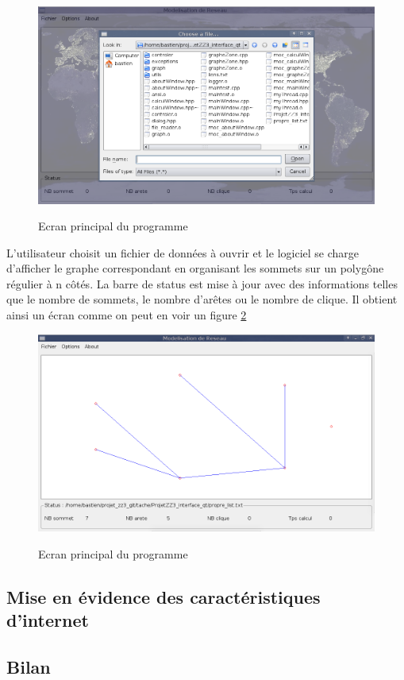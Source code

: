 \begin{figure}[H]
\centering
 \fbox
 {
 \includegraphics[width=16cm]{./schema/capture_ecran_donnees.png}
 }
  \caption{\label{ecran_donnees}Ecran principal du programme}
\end{figure}

L'utilisateur choisit un fichier de donn\'ees \`a ouvrir et le logiciel se charge d'afficher le graphe correspondant en organisant les sommets sur un polyg\^one r\'egulier \`a n c\^ot\'es.
La barre de status est mise \`a jour avec des informations telles que le nombre de sommets, le nombre d'ar\^etes ou le nombre de clique. Il obtient ainsi un \'ecran comme on peut en voir un figure \ref{ecran_graph}

\begin{figure}[H]
\centering
 \fbox
 {
 \includegraphics[width=16cm]{./schema/capture_ecran_graph.png}
 }
  \caption{\label{ecran_graph}Ecran principal du programme}
\end{figure}

\subsection{Mise en évidence des caractéristiques d'internet}

\subsection{Bilan}